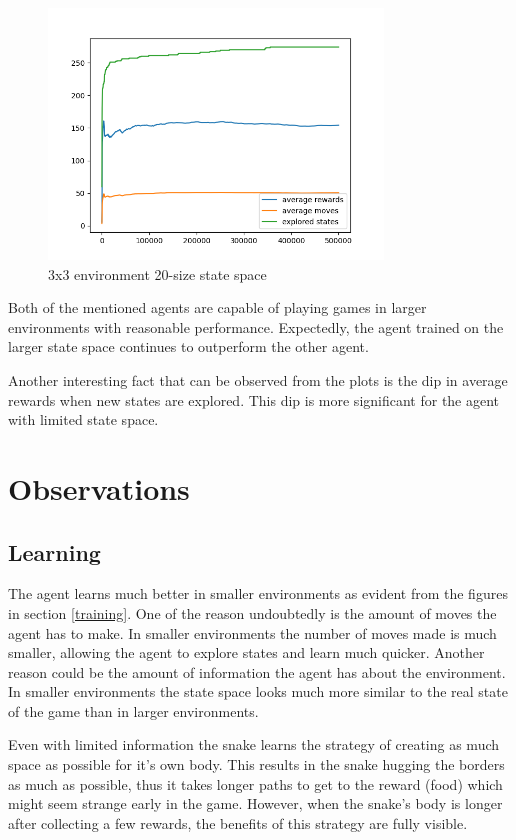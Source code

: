 \documentclass[lettersize,journal]{IEEEtran}
\begin{document}
\begin{figure}[!t]
\centering
\includegraphics[width=3.5in]{3-depth_fig.png}
\caption{3x3 environment 20-size state space}
\label{fig2}
\end{figure}


Both of the mentioned agents are capable of playing games in larger environments with
reasonable performance. Expectedly, the agent trained on the larger state space continues
to outperform the other agent.


Another interesting fact that can be observed from the plots is
the dip in average rewards when new states are explored. This dip
is more significant for the agent with limited state space.


\section{Observations}

\subsection{Learning}
The agent learns much better in smaller environments as evident from
the figures in section \ref{training}. One of the reason
undoubtedly is the amount of moves the agent has to make. In
smaller environments the number of moves made is much smaller,
allowing the agent to explore states and learn much quicker.
Another reason could be the amount of information the agent has
about the environment. In smaller environments the state space
looks much more similar to the real state of the game than in
larger environments.

Even with limited information the snake learns the strategy
of creating as much space as possible for it's own body.
This results in the snake hugging the borders as much
as possible, thus it takes longer paths to get to the reward (food) which
might seem strange early in the game.
However, when the snake's body is longer after collecting a
few rewards, the benefits of this strategy are fully visible.
\end{document}

